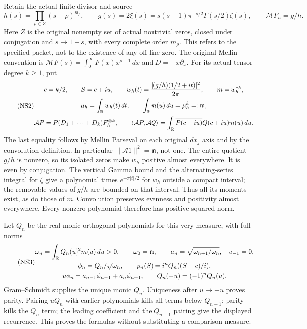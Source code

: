 Retain the actual finite divisor and source
\begin{equation}\tag{NS1}\label{sfsec:NS1}
h(s)=\prod_{\rho\in Z}(s-\rho)^{m_\rho},\qquad
g(s)=2\xi(s)=s(s-1)\pi^{-s/2}\Gamma(s/2)\zeta(s),\qquad
\mathcal M F_h=g/h.
\end{equation}
Here $Z$ is the original nonempty set of actual nontrivial zeros,
closed under conjugation and $s\mapsto1-s$, with every complete
order $m_\rho$. This refers to the specified packet, not to the
existence of any off-line zero. The original Mellin convention is
$\mathcal M F(s)=\int_0^\infty F(x)x^{s-1}\,dx$ and $D=-x\partial_x$.
For its actual tensor degree $k\geq1$, put
\begin{equation}\tag{NS2}\label{sfsec:NS2}
\begin{gathered}
c=k/2,\qquad S=c+iu,\qquad
w_h(t)=\frac{|(g/h)(1/2+it)|^2}{2\pi},\qquad m=w_h^{*k},\\
\mu_h=\int_\mathbb R w_h(t)\,dt,\qquad
\int_\mathbb R m(u)\,du=\mu_h^k=:\mathfrak m,\\
\mathcal A P=P(D_1+\cdots+D_k)F_h^{\otimes k},\qquad
\langle\mathcal A P,\mathcal A Q\rangle
 =\int_\mathbb R\overline{P(c+iu)}Q(c+iu)m(u)\,du .
\end{gathered}
\end{equation}
The last equality follows by Mellin Parseval on each original
$dx_j$ axis and by the convolution definition. In particular
$\|\mathcal A1\|^2=\mathfrak m$, not one.
The entire quotient $g/h$ is nonzero, so its isolated zeros make
$w_h$ positive almost everywhere. It is even by conjugation.
The vertical Gamma bound and the alternating-series integral for
$\zeta$ give a polynomial times $e^{-\pi|t|/2}$ for $w_h$ outside
a compact interval; the removable values of $g/h$ are bounded on
that interval. Thus all its moments exist, as do those of $m$.
Convolution preserves evenness and positivity almost everywhere.
Every nonzero polynomial therefore has positive squared norm.

Let $Q_n$ be the real monic orthogonal polynomials for this very
measure, with full norms
\begin{equation}\tag{NS3}\label{sfsec:NS3}
\begin{gathered}
\omega_n=\int_\mathbb R Q_n(u)^2m(u)\,du>0,\qquad
\omega_0=\mathfrak m,\qquad a_n=\sqrt{\omega_{n+1}/\omega_n},
\quad a_{-1}=0,\\
\phi_n=Q_n/\sqrt{\omega_n},\qquad
p_n(S)=i^nQ_n((S-c)/i),\\
u\phi_n=a_{n-1}\phi_{n-1}+a_n\phi_{n+1},
\qquad Q_n(-u)=(-1)^nQ_n(u).
\end{gathered}
\end{equation}
Gram--Schmidt supplies the unique monic $Q_n$. Uniqueness after
$u\mapsto-u$ proves parity. Pairing $uQ_n$ with earlier
polynomials kills all terms below $Q_{n-1}$; parity kills the
$Q_n$ term; the leading coefficient and the $Q_{n-1}$ pairing
give the displayed recurrence. This proves the formulas without
substituting a comparison measure.

